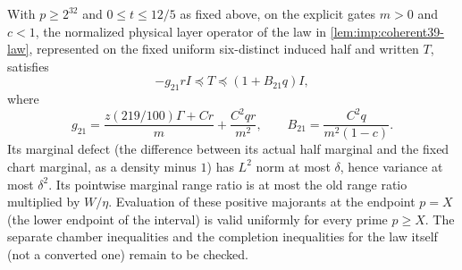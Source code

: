 \begin{proposition}
\label{imp:local:finite-coherent-layer}
With $p\ge2^{32}$ and $0\le t\le12/5$ as fixed above, on the explicit gates $m>0$ and $c<1$, the normalized physical
layer operator of the law in \cref{lem:imp:coherent39-law},
represented on the fixed uniform six-distinct induced half and
written $T$, satisfies
\begin{equation}\label{eq:merge-local-I-37}
 -g_{21}rI\preceq T\preceq(1+B_{21}q)I,
\end{equation}
where
\begin{equation}\label{eq:merge-local-I-38}
 g_{21}=\frac{z(219/100)\Gamma+Cr}{m}
                  +\frac{C^2qr}{m^2},\qquad
 B_{21}=\frac{C^2q}{m^2(1-c)}.
\end{equation}
Its marginal defect (the difference between its actual half
marginal and the fixed chart marginal, as a density minus $1$)
has $L^2$ norm at most $\delta$, hence variance at most
$\delta^2$. Its pointwise marginal range ratio is at
most the old range ratio multiplied by $W/\eta$.
Evaluation of these positive majorants at the endpoint $p=X$
(the lower endpoint of the interval) is valid uniformly for every
prime $p\ge X$. The separate chamber inequalities and the
completion inequalities for the law itself (not a converted one)
remain to be checked.
\end{proposition}

